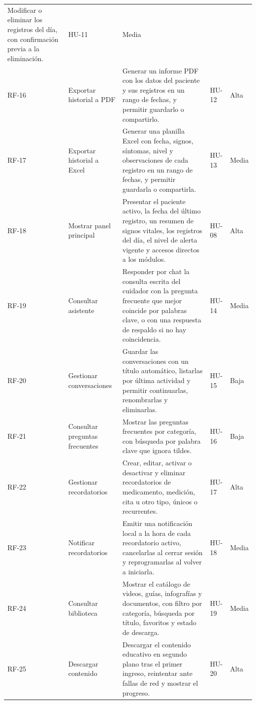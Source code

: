 \begin{xltabular}{\textwidth}{P{0.42}P{0.95}P{2.33}P{0.55}P{0.75}}
    Modificar o eliminar los registros del día, con confirmación previa a la
    eliminación. & HU-11 & Media \\
    RF-16 & Exportar historial a PDF &
    Generar un informe PDF con los datos del paciente y sus registros en un rango
    de fechas, y permitir guardarlo o compartirlo. & HU-12 & Alta \\
    RF-17 & Exportar historial a Excel &
    Generar una planilla Excel con fecha, signos, síntomas, nivel y
    observaciones de cada registro en un rango de fechas, y permitir guardarla o
    compartirla. & HU-13 & Media \\
    RF-18 & Mostrar panel principal &
    Presentar el paciente activo, la fecha del último registro, un resumen de
    signos vitales, los registros del día, el nivel de alerta vigente y accesos
    directos a los módulos. & HU-08 & Alta \\
    RF-19 & Consultar asistente &
    Responder por chat la consulta escrita del cuidador con la pregunta frecuente
    que mejor coincide por palabras clave, o con una respuesta de respaldo si no
    hay coincidencia. & HU-14 & Media \\
    RF-20 & Gestionar conversaciones &
    Guardar las conversaciones con un título automático, listarlas por última
    actividad y permitir continuarlas, renombrarlas y eliminarlas. & HU-15 & Baja \\
    RF-21 & Consultar preguntas frecuentes &
    Mostrar las preguntas frecuentes por categoría, con búsqueda por palabra
    clave que ignora tildes. & HU-16 & Baja \\
    RF-22 & Gestionar recordatorios &
    Crear, editar, activar o desactivar y eliminar recordatorios de medicamento, medición,
    cita u otro tipo, únicos o recurrentes. & HU-17 & Alta \\
    RF-23 & Notificar recordatorios &
    Emitir una notificación local a la hora de cada recordatorio activo,
    cancelarlas al cerrar sesión y reprogramarlas al volver a iniciarla. & HU-18 & Media \\
    RF-24 & Consultar biblioteca &
    Mostrar el catálogo de videos, guías, infografías y documentos, con filtro
    por categoría, búsqueda por título, favoritos y estado de descarga. & HU-19 & Media \\
    RF-25 & Descargar contenido &
    Descargar el contenido educativo en segundo plano tras el primer ingreso,
    reintentar ante fallas de red y mostrar el progreso. & HU-20 & Alta \\

\end{xltabular}

